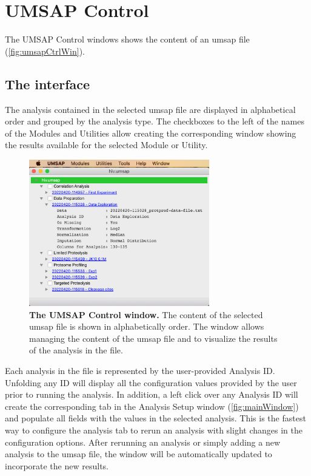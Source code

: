 \chapter{UMSAP Control}
\label{chap:umsapCtrl}

The UMSAP Control windows shows the content of an umsap file (\autoref{fig:umsapCtrlWin}).

\section{The interface}

The analysis contained in the selected umsap file are displayed in alphabetical
order and grouped by the analysis type. The checkboxes to the left of the names of
the Modules and Utilities allow creating the corresponding window showing the results
available for the selected Module or Utility.

\begin{figure}[h]
    \centering
    \includegraphics[width=0.7\textwidth]{./IMAGES/UMSAPCtrl/UMSAPCtrl.jpg}
    \caption[The UMSAP Control window]{\textbf{The UMSAP Control window.} The content
    of the selected umsap file is shown in alphabetically order. The window allows
    managing the content of the umsap file and to visualize the results of the analysis
    in the file.} 
    \label{fig:umsapCtrlWin}
    \vspace{-5pt}
\end{figure}

Each analysis in the file is represented by the user-provided Analysis ID. Unfolding
any ID will display all the configuration values provided by the user prior to running
the analysis. In addition, a left click over any Analysis ID will create the corresponding
tab in the Analysis Setup window (\autoref{fig:mainWindow}) and populate all fields
with the values in the selected analysis. This is the fastest way to configure the
analysis tab to rerun an analysis with slight changes in the configuration options.
After rerunning an analysis or simply adding a new analysis to the umsap file, the
window will be automatically updated to incorporate the new results.

